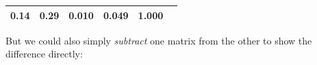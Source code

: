\documentclass[]{article}
\newenvironment{Shaded}{\begin{snugshade}}{\end{snugshade}}
\newcommand{\KeywordTok}[1]{\textcolor[rgb]{0.13,0.29,0.53}{\textbf{#1}}}
\newcommand{\StringTok}[1]{\textcolor[rgb]{0.31,0.60,0.02}{#1}}
\newcommand{\OperatorTok}[1]{\textcolor[rgb]{0.81,0.36,0.00}{\textbf{#1}}}
\newcommand{\NormalTok}[1]{#1}
\theoremstyle{definition}
\theoremstyle{definition}
\theoremstyle{definition}
\theoremstyle{remark}
\begin{document}
\begin{longtable}[]{@{}cccccc@{}}
\begin{minipage}[t]{0.13\columnwidth}
0.14\strut
\end{minipage} & \begin{minipage}[t]{0.13\columnwidth}\centering\strut
0.29\strut
\end{minipage} & \begin{minipage}[t]{0.15\columnwidth}\centering\strut
0.010\strut
\end{minipage} & \begin{minipage}[t]{0.12\columnwidth}\centering\strut
0.049\strut
\end{minipage} & \begin{minipage}[t]{0.12\columnwidth}\centering\strut
1.000\strut
\end{minipage}\tabularnewline
\bottomrule
\end{longtable}

But we could also simply \emph{subtract} one matrix from the other to
show the difference directly:

\begin{Shaded}
\end{Shaded}
\end{document}
